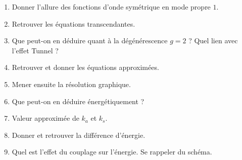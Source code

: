 \documentclass[a4paper, 11pt, hidelinks]{article}
\begin{document}
\begin{enumerate}
    \item Donner l'allure des fonctions d'onde symétrique en mode propre $1$. \cite{Chapitre23}
    \item Retrouver les équations transcendantes. \cite{Chapitre23}
    \item Que peut-on en déduire quant à la dégénérescence $g=2$ ? Quel lien avec l'effet Tunnel ? \cite{Chapitre23}
    \item Retrouver et donner les équations approximées. \cite{Chapitre23}
    \item Mener ensuite la résolution graphique. \cite{Chapitre23}
    \item Que peut-on en déduire énergétiquement ? \cite{Chapitre23}
    \item Valeur approximée de $k_a$ et $k_s$. \cite{Chapitre23}
    \item Donner et retrouver la différence d'énergie. \cite{Chapitre23}
    \item Quel est l'effet du couplage sur l'énergie. Se rappeler du schéma. \cite{Chapitre23}
\end{enumerate}




















\end{document}
